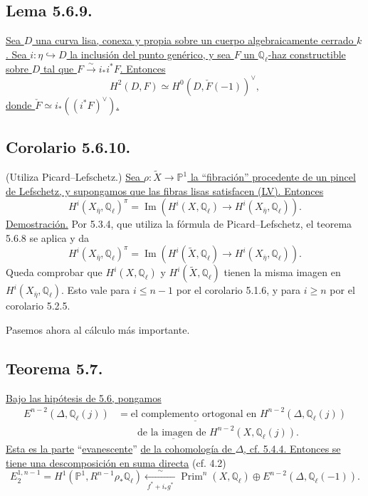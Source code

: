 \pageoriginale

\subsection*{Lema 5.6.9.}
\underline{Sea $D$ una curva lisa, conexa y propia sobre un cuerpo
algebraicamente cerrado $k$. Sea $i:\eta\hookrightarrow D$ la inclusión
del punto genérico, y sea $F$ un $\mathbb Q_\ell$-haz constructible
sobre $D$ tal que
$F\overset{\sim}{\longrightarrow}i_*i^*F$. Entonces}
\[
H^2(D,F)\simeq H^0(D,\check F(-1))^\vee,
\]
\underline{donde $\check F\simeq i_*((i^*F)^\vee)$.}

\subsection*{Corolario 5.6.10.}
\textup{(Utiliza Picard--Lefschetz.)}
\underline{Sea $\rho:\widetilde X\to\mathbb P^1$ la ``fibración''
procedente de un pincel de Lefschetz, y supongamos que las fibras lisas
satisfacen (LV). Entonces}
\begin{equation}\tag{5.6.10.1}
H^i(X_{\bar\eta},\mathbb Q_\ell)^\pi
=\operatorname{Im}\!\left(
H^i(X,\mathbb Q_\ell)\longrightarrow
H^i(X_{\bar\eta},\mathbb Q_\ell)
\right).
\end{equation}
\noindent\underline{Demostración.}
Por 5.3.4, que utiliza la fórmula de Picard--Lefschetz, el teorema
5.6.8 se aplica y da
\[
H^i(X_{\bar\eta},\mathbb Q_\ell)^\pi
=\operatorname{Im}\!\left(
H^i(\widetilde X,\mathbb Q_\ell)\longrightarrow
H^i(X_{\bar\eta},\mathbb Q_\ell)
\right).
\]
Queda comprobar que $H^i(X,\mathbb Q_\ell)$ y
$H^i(\widetilde X,\mathbb Q_\ell)$ tienen la misma imagen en
$H^i(X_{\bar\eta},\mathbb Q_\ell)$. Esto vale para $i\leq n-1$ por el
corolario 5.1.6, y para $i\geq n$ por el corolario 5.2.5.

Pasemos ahora al cálculo más importante.

\subsection*{Teorema 5.7.}
\underline{Bajo las hipótesis de 5.6, pongamos}
\[
\begin{aligned}
E^{n-2}(\Delta,\mathbb Q_\ell(j))
&=\underline{\text{el complemento ortogonal en }}
H^{n-2}(\Delta,\mathbb Q_\ell(j))\\
&\qquad\underline{\text{de la imagen de }}
H^{n-2}(X,\mathbb Q_\ell(j)).
\end{aligned}
\]
\underline{Esta es la parte} ``\underline{evanescente}'' \underline{de la cohomología de
$\Delta$, cf. 5.4.4. Entonces se tiene una descomposición en suma
directa} (cf. 4.2)
\begin{equation}\tag{5.7.1}
E_2^{1,n-1}
=H^1(\mathbb P^1,R^{n-1}\rho_*\mathbb Q_\ell)
\xleftarrow[\;f^*+i_*g^*\;]{\sim}
\operatorname{Prim}^n(X,\mathbb Q_\ell)
\oplus E^{n-2}(\Delta,\mathbb Q_\ell(-1)).
\end{equation}

